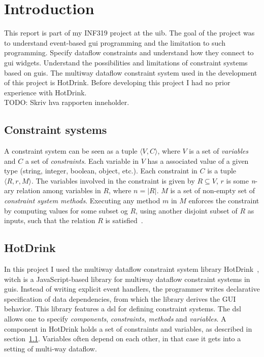 \chapter{Introduction}

This report is part of my INF319 project at the \gls{uib}. The goal of the project was to
understand event-based \gls{gui} programming and the limitation to such programming.
Specify dataflow constraints and understand how they connect to \gls{gui} widgets.
Understand the possibilities and limitations of constraint systems based on \gls{gui}s.
The multiway dataflow constraint system used in the development of this project is
HotDrink. Before developing this project I had no prior experience with HotDrink. 
\\TODO: Skriv hva rapporten inneholder.
\newpage

\section{Constraint systems}
\label{sec:constraint-systems}
A constraint system can be seen as a tuple ${\langle V, C \rangle}$, where $V$ is a set 
of \textit{variables} and $C$ a set of \textit{constraints}. Each variable in $V$ has a 
associated value of a given type (string, integer, boolean, object, etc.). Each 
constraint in $C$ is a tuple ${\langle R, r, M \rangle}$. The variables involved in the 
constraint is given by ${R \subseteq V}$, $r$ is some \textit{n}-ary relation among 
variables in $R$, where ${n = \lvert R \rvert}$. $M$ is a set of non-empty set of 
\textit{constraint system methods}. Executing any method $m$ in $M$ enforces the 
constraint by computing values for some subset og $R$, using another disjoint subset of 
$R$ as inputs, such that the relation $R$ is satisfied~\cite{AlgorithmsForUserInterfaces}. 

\section{HotDrink}

In this project I used the multiway dataflow constraint system library 
HotDrink~\cite{HotDrink}, witch is a JavaScript-based library for multiway dataflow 
constraint systems in \gls{gui}s. Instead of writing explicit event handlers,
the programmer writes declarative specification of data dependencies,
from which the library derives the GUI behavior.
This library features a \gls{dsl} for defining constraint systems.
The \gls{dsl} allows one to specify \emph{components}, \emph{constraints}, \emph{methods} 
and \emph{variables}.
A component in HotDrink holds a set of constraints and variables, as described in 
section~\ref{sec:constraint-systems}. Variables often depend on each other,
in that case it gets into a setting of multi-way dataflow.

